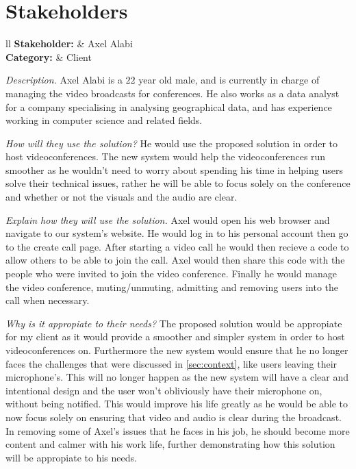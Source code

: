 \section{Stakeholders}

\begin{tblr}{ll}
  \textsf{\bfseries Stakeholder: } & Axel Alabi\\
  \textsf{\bfseries Category: } & Client\\
\end{tblr}
\vspace{0.2cm}

\textit{Description.} %
Axel Alabi is a $22$ year old male, and is currently in charge 
of managing the video broadcasts for conferences. He also
works as a data analyst for a company specialising in analysing
geographical data, and has experience working in computer 
science and related fields. \vspace{0.2cm}

\textit{How will they use the solution?} %
He would use the proposed solution in order to host
videoconferences. The new system would help the 
videoconferences run smoother as he wouldn't need to worry 
about spending his time in helping users solve their technical
issues, rather he will be able to focus solely on the
conference and whether or not the visuals and the audio are
clear. \vspace{0.2cm}

\textit{Explain how they will use the solution.}
Axel would open his web browser and navigate to our system's
website. He would log in to his personal account then go to
the create call page. After starting a video call he would 
then recieve a code to allow others to be able to join the
call. Axel would then share this code with the people who
were invited to join the video conference. Finally he would 
manage the video conference, muting/unmuting, admitting 
and removing users into the call when necessary.
\vspace{0.2cm}

\textit{Why is it appropiate to their needs?} %
The proposed solution would be appropiate for my client as it
would provide a smoother and simpler system in order to host 
videoconferences on. Furthermore the new system would ensure
that he no longer faces the challenges that were discussed
in \ref{sec:context}, like users leaving their microphone's.
This will no longer happen as the new system will have a 
clear and intentional design and the user won't obliviously 
have their microphone on, without being notified. This would 
improve his life greatly as he would be able to now focus 
solely on ensuring that video and audio is clear during the 
broadcast. In removing some of Axel's issues that he faces in
his job, he should become more content and calmer with his
work life, further demonstrating how this solution will be 
appropiate to his needs.
\vspace{0.2cm}

